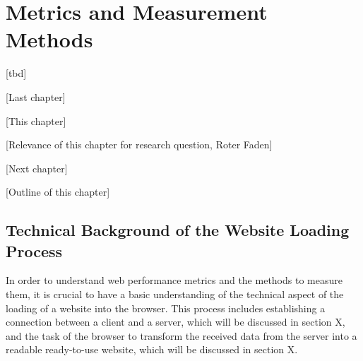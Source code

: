 \chapter{Metrics and Measurement Methods}

[tbd]


[Last chapter]



[This chapter]





[Relevance of this chapter for research question, Roter Faden]





[Next chapter]





[Outline of this chapter]










\section{Technical Background of the Website Loading Process}



In order to understand web performance metrics and the methods to measure them, it is crucial to have a basic understanding of the technical aspect of the loading of a website into the browser.
This process includes establishing a connection between a client and a server, which will be discussed in section X, and the task of the browser to transform the received data from the server into a readable ready-to-use website, which will be discussed in section X.


